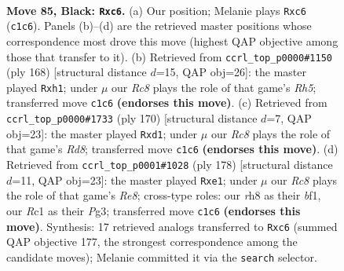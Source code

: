 \documentclass[11pt]{article}
\begin{document}
\clearpage

\begin{figure}[p]\centering
\begin{subfigure}{0.46\textwidth}\centering
\resizebox{\linewidth}{!}{%
\newchessgame
\chessboard[
  setfen={7R/5k2/2Q5/5p2/8/8/6K1/2r5 b - - 0 85},
  showmover=false,
  pgfstyle=straightmove, color=movearrow, markmove={c1-c6}
]}
\caption{}
\end{subfigure}\hfill
\begin{subfigure}{0.46\textwidth}\centering
\resizebox{\linewidth}{!}{%
\newchessgame
\chessboard[
  setfen={8/8/3k4/7R/3p1K2/1P1P4/1r6/7q w - - 0 85},
  showmover=false,
  pgfstyle=straightmove, color=movearrow, markmove={h5-h1}
]}
\caption{}
\end{subfigure}
\\[4pt]
\begin{subfigure}{0.46\textwidth}\centering
\resizebox{\linewidth}{!}{%
\newchessgame
\chessboard[
  setfen={3R4/2r5/8/1P6/2k5/8/1K6/3q4 w - - 0 86},
  showmover=false,
  pgfstyle=straightmove, color=movearrow, markmove={d8-d1}
]}
\caption{}
\end{subfigure}\hfill
\begin{subfigure}{0.46\textwidth}\centering
\resizebox{\linewidth}{!}{%
\newchessgame
\chessboard[
  setfen={4R3/8/8/5k2/8/1K4P1/8/4qb2 w - - 2 90},
  showmover=false,
  pgfstyle=straightmove, color=movearrow, markmove={e8-e1}
]}
\caption{}
\end{subfigure}
\caption{\textbf{Move 85, Black: \texttt{Rxc6}.} (a) Our position; Melanie plays \texttt{Rxc6} (\texttt{c1c6}). Panels (b)--(d) are the retrieved master positions whose correspondence most drove this move (highest QAP objective among those that transfer to it). (b) Retrieved from \texttt{ccrl\_top\_p0000\#1150} (ply 168) [structural distance $d$=15, QAP obj=26]: the master played \texttt{Rxh1}; under $\mu$ our \emph{Rc8} plays the role of that game's \emph{Rh5}; transferred move \texttt{c1c6} \textbf{(endorses this move)}. (c) Retrieved from \texttt{ccrl\_top\_p0000\#1733} (ply 170) [structural distance $d$=7, QAP obj=23]: the master played \texttt{Rxd1}; under $\mu$ our \emph{Rc8} plays the role of that game's \emph{Rd8}; transferred move \texttt{c1c6} \textbf{(endorses this move)}. (d) Retrieved from \texttt{ccrl\_top\_p0001\#1028} (ply 178) [structural distance $d$=11, QAP obj=23]: the master played \texttt{Rxe1}; under $\mu$ our \emph{Rc8} plays the role of that game's \emph{Re8}; cross-type roles: our \emph{r}h8 as their \emph{b}f1, our \emph{R}c1 as their \emph{P}g3; transferred move \texttt{c1c6} \textbf{(endorses this move)}. Synthesis: 17 retrieved analogs transferred to \texttt{Rxc6} (summed QAP objective 177, the strongest correspondence among the candidate moves); Melanie committed it via the \texttt{search} selector.}
\label{fig:thought-m169}
\end{figure}
\end{document}

